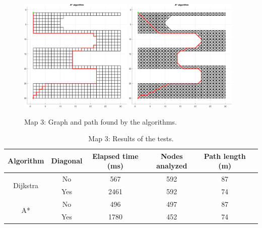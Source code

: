 \begin{figure}[H]
    \includegraphics[width=0.48\textwidth]{./img/MATLAB/03_astar_orthogonal.pdf}
    \hspace{6pt}
    \includegraphics[width=0.48\textwidth]{./img/MATLAB/03_astar_diagonal.pdf}
    \caption{Map 3: Graph and path found by the algorithms.}
    \label{fig:map_3_results}
\end{figure}

\begin{table}[H]
    \centering
    \begin{tabular}{|c|c|c|c|c|c|}
        \hline
        \textbf{Algorithm}        & \textbf{Diagonal} & \textbf{Elapsed time (ms)} & \textbf{Nodes analyzed} & \textbf{Path length (m)} \\
        \hline
        \multirow{2}{*}{Dijkstra} & No                & 567                        & 592                     & 87                       \\
                                  & Yes               & 2461                       & 592                     & 74                       \\
        \hline
        \multirow{2}{*}{A*}       & No                & 496                        & 497                     & 87                       \\
                                  & Yes               & 1780                       & 452                     & 74                       \\
        \hline
    \end{tabular}
    \caption{Map 3: Results of the tests.}
    \label{tab:map_3_results}
\end{table}


